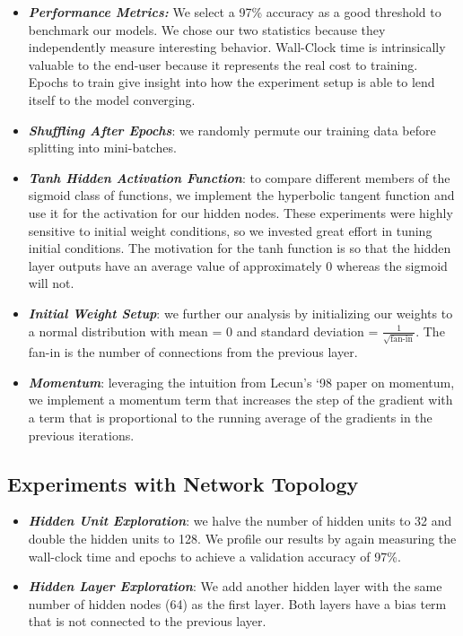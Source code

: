 \documentclass{article} %
\begin{document}
\begin{itemize}
\item \textbf{\textit{Performance Metrics:}} We select a 97\% accuracy as a good threshold to benchmark our models.  We chose our two statistics because they independently measure interesting behavior.  Wall-Clock time is intrinsically valuable to the end-user because it represents the real cost to training.  Epochs to train give insight into how the experiment setup is able to lend itself to the model converging.
\item \textbf{\textit{Shuffling After Epochs}}: we randomly permute our training data before splitting into mini-batches.  
\item \textbf{\textit{Tanh Hidden Activation Function}}: to compare different members of the sigmoid class of functions, we implement the hyperbolic tangent function and use it for the activation for our hidden nodes.  These experiments were highly sensitive to initial weight conditions, so we invested great effort in tuning initial conditions.  The motivation for the tanh function is so that the hidden layer outputs have an average value of approximately 0 whereas the sigmoid will not.  
\item \textbf{\textit{Initial Weight Setup}}: we further our analysis by initializing our weights to a normal distribution with mean = 0 and standard deviation = $\frac{1}{\sqrt{\text{fan-in}}}$.  The fan-in is the number of connections from the previous layer.
\item \textbf{\textit{Momentum}}: leveraging the intuition from Lecun's `98 paper on momentum, we implement a momentum term that increases the step of the gradient with a term that is proportional to the running average of the gradients in the previous iterations.  
\end{itemize}

\subsection*{Experiments with Network Topology}

\begin{itemize}
\item \textbf{\textit{Hidden Unit Exploration}}: we halve the number of hidden units to 32 and double the hidden units to 128.  We profile our results by again measuring the wall-clock time and epochs to achieve a validation accuracy of 97\%.
\item \textbf{\textit{Hidden Layer Exploration}}: We add another hidden layer with the same number of hidden nodes (64) as the first layer.  Both layers have a bias term that is not connected to the previous layer.  
\end{itemize}
\end{document}
